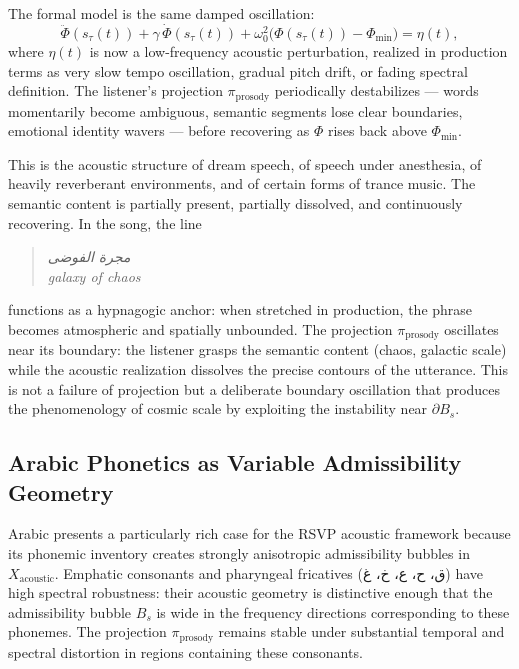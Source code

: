 \documentclass[12pt, a4paper]{article}
\theoremstyle{essaystyle}
\begin{document}
The formal model is the same damped oscillation:
\[
\ddot{\Phi}(s_\tau(t)) + \gamma\,\dot{\Phi}(s_\tau(t)) + \omega_0^2
\bigl(\Phi(s_\tau(t)) - \Phi_{\min}\bigr) = \eta(t),
\]
where $\eta(t)$ is now a low-frequency acoustic perturbation, realized in production
terms as very slow tempo oscillation, gradual pitch drift, or fading spectral definition.
The listener's projection $\pi_{\mathrm{prosody}}$ periodically destabilizes ---
words momentarily become ambiguous, semantic segments lose clear boundaries, emotional
identity wavers --- before recovering as $\Phi$ rises back above $\Phi_{\min}$.

This is the acoustic structure of dream speech, of speech under anesthesia, of heavily
reverberant environments, and of certain forms of trance music. The semantic content
is partially present, partially dissolved, and continuously recovering. In the song,
the line

\begin{quote}
\textit{مجرة الفوضى} \\
\textit{galaxy of chaos}
\end{quote}

functions as a hypnagogic anchor: when stretched in production, the phrase becomes
atmospheric and spatially unbounded. The projection $\pi_{\mathrm{prosody}}$ oscillates
near its boundary: the listener grasps the semantic content (chaos, galactic scale)
while the acoustic realization dissolves the precise contours of the utterance.
This is not a failure of projection but a deliberate boundary oscillation that
produces the phenomenology of cosmic scale by exploiting the instability near
$\partial B_s$.

\subsection{Arabic Phonetics as Variable Admissibility Geometry}

Arabic presents a particularly rich case for the RSVP acoustic framework because its
phonemic inventory creates strongly anisotropic admissibility bubbles in
$X_{\mathrm{acoustic}}$. Emphatic consonants and pharyngeal fricatives (ق، ح، ع، خ، غ)
have high spectral robustness: their acoustic geometry is distinctive enough that
the admissibility bubble $B_s$ is wide in the frequency directions corresponding to
these phonemes. The projection $\pi_{\mathrm{prosody}}$ remains stable under
substantial temporal and spectral distortion in regions containing these consonants.
\end{document}
